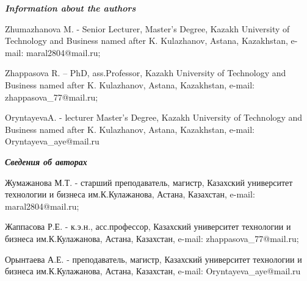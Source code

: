 \begin{authorinfo}
\hspace{1em}\emph{{\bfseries Information about the authors}}

Zhumazhanova M. - Senior Lecturer, Master's Degree, Kazakh University of
Technology and Business named after K. Kulazhanov, Astana, Kazakhstan,
e-mail: maral2804@mail.ru;

Zhappasova R. -- PhD, ass.Professor, Kazakh University of Technology and
Business named after K. Kulazhanov, Astana, Kazakhstan, e-mail:
zhappasova\_77@mail.ru;

OryntayevaA. - lecturer Master's Degree, Kazakh University of Technology
and Business named after K. Kulazhanov, Astana, Kazakhstan, e-mail:
Oryntayeva\_aye@mail.ru


\hspace{1em}\emph{{\bfseries Сведения об авторах}}

Жумажанова М.Т. - старший преподаватель, магистр, Казахский университет
технологии и бизнеса им.К.Кулажанова, Астана, Казахстан, e-mail:
maral2804@mail.ru;

Жаппасова Р.Е. - к.э.н., асс.профессор, Казахский университет технологии
и бизнеса им.К.Кулажанова, Астана, Казахстан, e-mail: zhappasova\_77@mail.ru;

Орынтаева А.Е. - преподаватель, магистр, Казахский университет
технологии и бизнеса им.К.Кулажанова, Астана, Казахстан, e-mail: Oryntayeva\_aye@mail.ru
\end{authorinfo}
